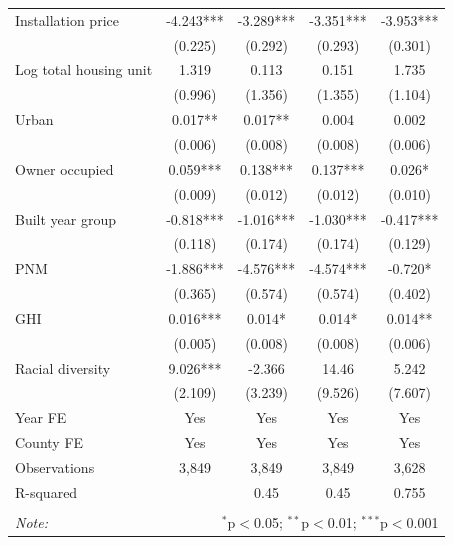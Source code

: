\documentclass[11pt,twoside,letterpaper]{article}
\begin{document}
\begin{table}[H]
{\begin{tabular}{lcccc}
Installation price & -4.243*** & -3.289*** & -3.351*** & -3.953*** \\
 & (0.225) & (0.292) & (0.293) & (0.301) \\
Log total housing unit & 1.319 & 0.113 & 0.151 & 1.735 \\
 & (0.996) & (1.356) & (1.355) & (1.104) \\
Urban & 0.017** & 0.017** & 0.004 & 0.002 \\
 & (0.006) & (0.008) & (0.008) & (0.006) \\
Owner occupied & 0.059*** & 0.138*** & 0.137*** & 0.026* \\
 & (0.009) & (0.012) & (0.012) & (0.010) \\
Built year group & -0.818*** & -1.016*** & -1.030*** & -0.417*** \\
 & (0.118) & (0.174) & (0.174) & (0.129) \\
PNM & -1.886*** & -4.576*** & -4.574*** & -0.720* \\
 & (0.365) & (0.574) & (0.574) & (0.402) \\
GHI & 0.016*** & 0.014* & 0.014* & 0.014** \\
 & (0.005) & (0.008) & (0.008) & (0.006) \\
Racial diversity & 9.026*** & -2.366 & 14.46 & 5.242 \\
 & (2.109) & (3.239) & (9.526) & (7.607) \\ \hline
Year FE & Yes & Yes & Yes & \multicolumn{1}{c}{Yes} \\
County FE & Yes & Yes & Yes & \multicolumn{1}{c}{Yes} \\
Observations & 3,849 & 3,849 & 3,849 & \multicolumn{1}{c}{3,628} \\
\multicolumn{2}{l}{R-squared} & 0.45 & 0.45 & 0.755 \\ \hline
\hline \\[-1.8ex]
\textit{Note:} & \multicolumn{4}{r}{$^{*}$p$<$0.05; $^{**}$p$<$0.01; $^{***}$p$<$0.001} \\
\end{tabular}}
\end{table}
\end{document}
